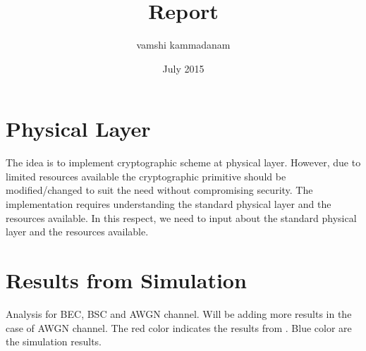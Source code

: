 \documentclass{article}
\title{Report}
\author{vamshi kammadanam}
\date{July 2015}
\begin{document}
\maketitle

\section{Physical Layer}
The idea is to implement cryptographic scheme at physical layer. However, due to limited resources available the cryptographic primitive should be modified/changed to suit the need without compromising security. The implementation requires understanding the standard physical layer and the resources available. In this respect, we need to input about the standard physical layer and the resources available.

\section{Results from Simulation}
Analysis for BEC, BSC and AWGN channel. Will be adding more results in the case of AWGN channel. The red color indicates the results from \cite{arikan2008performance}. Blue color are the simulation results.

\end{document}
